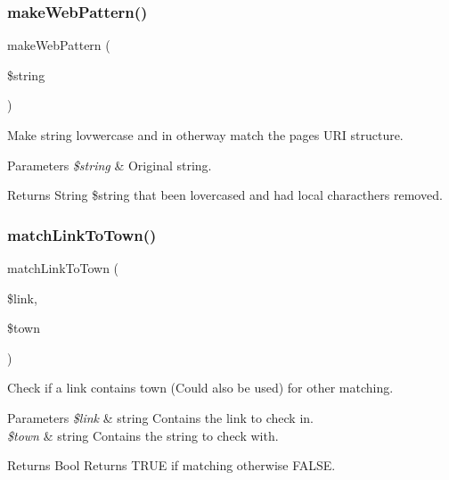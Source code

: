 \subsubsection{\texorpdfstring{make\+Web\+Pattern()}{makeWebPattern()}}
{\footnotesize\ttfamily make\+Web\+Pattern (\begin{DoxyParamCaption}\item[{}]{\$string }\end{DoxyParamCaption})\hspace{0.3cm}{\ttfamily [protected]}}



Make string lovwercase and in otherway match the pages U\+RI structure. 


\begin{DoxyParams}{Parameters}
{\em \$string} & Original string. \\
\hline
\end{DoxyParams}
\begin{DoxyReturn}{Returns}
String \$string that been lovercased and had local characthers removed. 
\end{DoxyReturn}
\hypertarget{veganistan_8php_a036078d10f25b186e72c0a54943dc077}{}\label{veganistan_8php_a036078d10f25b186e72c0a54943dc077} 
\subsubsection{\texorpdfstring{match\+Link\+To\+Town()}{matchLinkToTown()}}
{\footnotesize\ttfamily match\+Link\+To\+Town (\begin{DoxyParamCaption}\item[{}]{\$link,  }\item[{}]{\$town }\end{DoxyParamCaption})\hspace{0.3cm}{\ttfamily [protected]}}



Check if a link contains town (Could also be used) for other matching. 


\begin{DoxyParams}{Parameters}
{\em \$link} & string Contains the link to check in. \\
\hline
{\em \$town} & string Contains the string to check with. \\
\hline
\end{DoxyParams}
\begin{DoxyReturn}{Returns}
Bool Returns T\+R\+UE if matching otherwise F\+A\+L\+SE. 
\end{DoxyReturn}
\hypertarget{veganistan_8php_a3efb5bb55d51db5839c3e83b0f490c75}{}\label{veganistan_8php_a3efb5bb55d51db5839c3e83b0f490c75} 
